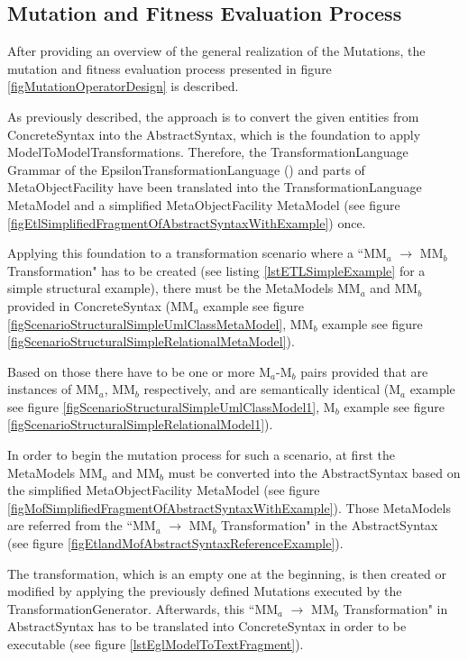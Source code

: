 \subsection{Mutation and Fitness Evaluation Process}
\label{secMutationProcess}

After providing an overview of the general realization of the \glspl{Mutation}, the mutation and fitness evaluation process presented in figure \ref{figMutationOperatorDesign} is described.

As previously described, the approach is to convert the given entities from \gls{ConcreteSyntax} into the \gls{AbstractSyntax}, which is the foundation to apply \glspl{ModelToModelTransformation}. Therefore, the \gls{TransformationLanguage} \gls{Grammar} of the \gls{EpsilonTransformationLanguage} (\cite{EclipseFoundation2014}) and parts of \gls{MetaObjectFacility} have been translated into the \gls{TransformationLanguage} \gls{MetaModel} and a simplified \gls{MetaObjectFacility} \gls{MetaModel} (see figure \ref{figEtlSimplifiedFragmentOfAbstractSyntaxWithExample}) once.

Applying this foundation to a transformation scenario where a ``MM$_a$ $\rightarrow$ MM$_b$ Transformation" has to be created (see listing \ref{lstETLSimpleExample} for a simple structural example), there must be the \glspl{MetaModel} MM$_a$ and MM$_b$ provided in \gls{ConcreteSyntax} (MM$_a$ example see figure \ref{figScenarioStructuralSimpleUmlClassMetaModel}, MM$_b$ example see figure \ref{figScenarioStructuralSimpleRelationalMetaModel}). 

Based on those there have to be one or more M$_a$-M$_b$ pairs provided that are instances of MM$_a$, MM$_b$ respectively, and are semantically identical (M$_a$ example see figure \ref{figScenarioStructuralSimpleUmlClassModel1}, M$_b$ example see figure \ref{figScenarioStructuralSimpleRelationalModel1}).

In order to begin the mutation process for such a scenario, at first the \glspl{MetaModel} MM$_a$ and MM$_b$ must be converted into the \gls{AbstractSyntax} based on the simplified \gls{MetaObjectFacility} \gls{MetaModel} (see figure \ref{figMofSimplifiedFragmentOfAbstractSyntaxWithExample}). Those \glspl{MetaModel} are referred from the ``MM$_a$ $\rightarrow$ MM$_b$ Transformation" in the \gls{AbstractSyntax} (see figure \ref{figEtlandMofAbstractSyntaxReferenceExample}).

The transformation, which is an empty one at the beginning, is then created or modified by applying the previously defined \glspl{Mutation} executed by the \gls{TransformationGenerator}. Afterwards, this ``MM$_a$ $\rightarrow$ MM$_b$ Transformation" in \gls{AbstractSyntax} has to be translated into \gls{ConcreteSyntax} in order to be executable (see figure \ref{lstEglModelToTextFragment}).

